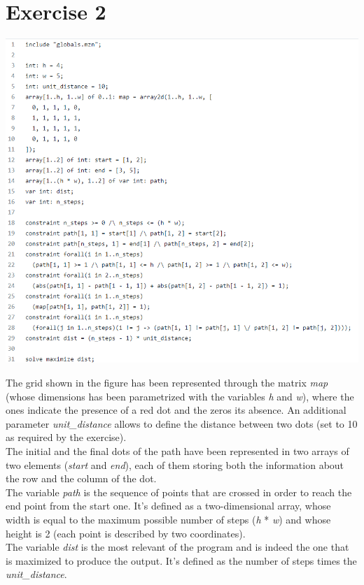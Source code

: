 \documentclass{article}
\begin{document}
\section{Exercise 2}
\vspace{0.2cm}
\includegraphics[width=\linewidth]{img/Es2.png}
\vspace{0.2cm}

The grid shown in the figure has been represented through the matrix \textit{map} (whose dimensions has been parametrized
with the variables \textit{h} and \textit{w}), where the ones indicate the presence of a red dot and the zeros its
absence. An additional parameter \textit{unit\_distance} allows to define the distance between two dots 
(set to 10 as required by the exercise).\\
The initial and the final dots of the path have been represented in two arrays of two elements (\textit{start} and \textit{end}), 
each of them storing both the information about the row and the column of the dot.\\
The variable \textit{path} is the sequence of points that are crossed in order to reach the end point from
the start one. It's defined as a two-dimensional array, whose width is equal to the maximum possible number of steps (\textit{h} * \textit{w}) 
and whose height is 2 (each point is described by two coordinates).\\
The variable \textit{dist} is the most relevant of the program and is indeed the one that is maximized to produce the output.
It's defined as the number of steps times the \textit{unit\_distance}.
\end{document}
